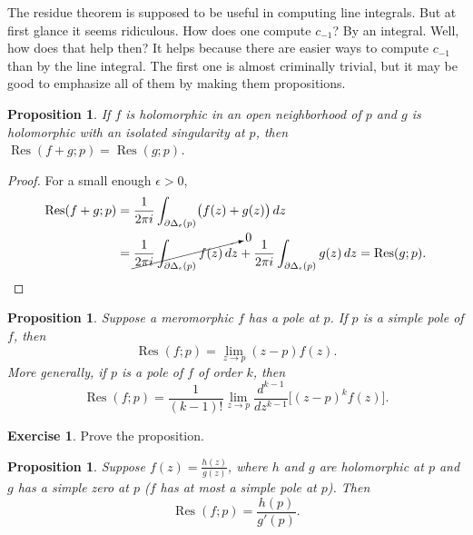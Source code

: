 \documentclass[12pt,openany]{book}
\theoremstyle{plain}
\newtheorem{prop}[thm]{Proposition}
\theoremstyle{remark}
\theoremstyle{definition}
\newenvironment{exbox}{%
    \def\FrameCommand{\vrule width 1pt \relax\hspace{10pt}}%
    \MakeFramed{\advance\hsize-\width\FrameRestore}%
}{%
    \endMakeFramed
}
\theoremstyle{exercise}
\newtheorem{exercise}{Exercise}[section]
\theoremstyle{example}
\begin{document}
The residue theorem is supposed to be useful in computing line integrals.
But at first glance it seems ridiculous.  How does one compute $c_{-1}$?  By
an integral.  Well, how does that help then?  It helps because there are
easier ways to compute $c_{-1}$ than by the line integral.  The first one is
almost criminally trivial, but it may be good to emphasize all of them
by making them propositions.

\begin{prop}
If $f$ is holomorphic in an open neighborhood of $p$ and $g$ is holomorphic
with an isolated singularity at $p$, then
$\operatorname{Res}(f+g;p) = \operatorname{Res}(g;p)$.
\end{prop}

\begin{proof}
For a small enough $\epsilon > 0$,
\begin{equation*}
\begin{split}
\operatorname{Res}(f+g;p)
& =
\frac{1}{2\pi i}
\int_{\partial \Delta_{\epsilon}(p)}
\bigl(f(z)+g(z)\bigr) \, dz
\\
& =
\cancelto{0}{
\frac{1}{2\pi i}
\int_{\partial \Delta_{\epsilon}(p)}
f(z) \, dz
}
+
\frac{1}{2\pi i}
\int_{\partial \Delta_{\epsilon}(p)}
g(z) \, dz
=
\operatorname{Res}(g;p) . \qedhere
\end{split}
\end{equation*}
\end{proof}

\begin{prop}
Suppose a meromorphic $f$ has a pole at $p$.
If $p$ is a simple pole of $f$, then
\begin{equation*}
\operatorname{Res}(f;p) = \lim_{z\to p} (z-p) f(z) .
\end{equation*}
More generally, if $p$ is a pole of $f$ of order $k$, then
\begin{equation*}
\operatorname{Res}(f;p) = \frac{1}{(k-1)!} \lim_{z\to p}
\frac{d^{k-1}}{dz^{k-1}}\bigl[ (z-p)^{k} f(z) \bigr] .
\end{equation*}
\end{prop}

\begin{exbox}
\begin{exercise}
Prove the proposition.
\end{exercise}
\end{exbox}

\begin{prop} \label{prop:residuesimpleratio}
Suppose $f(z) = \frac{h(z)}{g(z)}$, where $h$ and $g$ are holomorphic
at $p$ and $g$ has a simple zero at $p$
($f$ has at most a simple pole at $p$).
Then
\begin{equation*}
\operatorname{Res}(f;p) = \frac{h(p)}{g'(p)} .
\end{equation*}
\end{prop}
\end{document}
